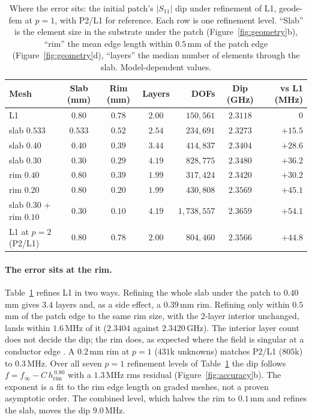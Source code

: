 \documentclass{anvil-paper}
\newcommand{\PL}{P2/L1}
\begin{document}
\begin{table}[t]
  \centering
  \caption{Where the error sits: the initial patch's $|S_{11}|$ dip under
  refinement of L1, geode-fem at $p = 1$, with \PL{} for reference. Each row
  is one refinement level. ``Slab'' is the element size in the substrate
  under the patch (Figure~\ref{fig:geometry}b), ``rim'' the mean edge length
  within $0.5$\,mm of the patch edge (Figure~\ref{fig:geometry}d), ``layers''
  the median number of elements through the slab. Model-dependent values.}
  \label{tab:x1}
  \small
  \begin{tabular}{@{}l c c c r c r@{}}
    \toprule
    Mesh & Slab (mm) & Rim (mm) & Layers & DOFs & Dip (GHz) & vs L1 (MHz) \\
    \midrule
    L1 & $0.80$ & $0.78$ & $2.00$ & $150{,}561$ & $2.3118$ & $0$ \\
    slab $0.533$ & $0.533$ & $0.52$ & $2.54$ & $234{,}691$ & $2.3273$ & $+15.5$ \\
    slab $0.40$ & $0.40$ & $0.39$ & $3.44$ & $414{,}837$ & $2.3404$ & $+28.6$ \\
    slab $0.30$ & $0.30$ & $0.29$ & $4.19$ & $828{,}775$ & $2.3480$ & $+36.2$ \\
    rim $0.40$ & $0.80$ & $0.39$ & $1.99$ & $317{,}424$ & $2.3420$ & $+30.2$ \\
    rim $0.20$ & $0.80$ & $0.20$ & $1.99$ & $430{,}808$ & $2.3569$ & $+45.1$ \\
    slab $0.30$ + rim $0.10$ & $0.30$ & $0.10$ & $4.19$ & $1{,}738{,}557$ & $2.3659$ & $+54.1$ \\
    \midrule
    L1 at $p = 2$ (\PL) & $0.80$ & $0.78$ & $2.00$ & $804{,}460$ & $2.3566$ & $+44.8$ \\
    \bottomrule
  \end{tabular}
\end{table}

\paragraph{The error sits at the rim.}
Table~\ref{tab:x1} refines L1 in two ways. Refining the whole slab under the
patch to $0.40$\,mm gives $3.4$ layers and, as a side effect, a $0.39$\,mm
rim. Refining only within $0.5$\,mm of the patch edge to the same rim size,
with the 2-layer interior unchanged, lands within $1.6$\,MHz of it
($2.3404$ against $2.3420$\,GHz). The interior layer count does not decide
the dip; the rim does, as expected where the field is singular at a
conductor edge \citep{meixner1972behavior}. A $0.2$\,mm rim at $p = 1$
($431$k unknowns) matches \PL{} ($805$k) to $0.3$\,MHz. Over all seven
$p = 1$ refinement levels of Table~\ref{tab:x1} the dip follows $f = f_\infty - C\,h_{\mathrm{rim}}^{\,0.80}$
with a $1.3$\,MHz rms residual (Figure~\ref{fig:accuracy}b). The exponent is
a fit to the rim edge length on graded meshes, not a proven
asymptotic order. The combined level, which halves the rim to $0.1$\,mm and
refines the slab, moves the dip $9.0$\,MHz.
\end{document}
